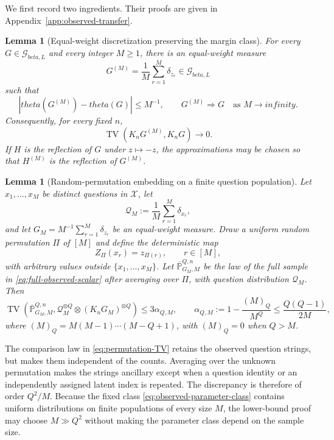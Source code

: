 \documentclass[11pt]{article}
\def\beta{beta}%
\def\theta{theta}%
\def\infty{infinity}%
\newtheorem{lemma}[theorem]{Lemma}
\newcommand{\TV}{\operatorname{TV}}
\newcommand{\calQ}{\mathcal Q}
\newcommand{\calG}{\mathcal G}
\begin{document}
We first record two ingredients.  Their proofs are given in Appendix~\ref{app:observed-transfer}.

\begin{lemma}[Equal-weight discretization preserving the margin class]
\label{lem:equal-weight-discretization}
For every $G\in\calG_{\beta,L}$ and every integer $M\ge1$, there is an equal-weight measure
\[
G^{(M)}
=
\frac1M\sum_{r=1}^M\delta_{z_r}
\in\calG_{\beta,L}
\]
such that
\[
|\theta(G^{(M)})-\theta(G)|\le M^{-1},
\qquad
G^{(M)}\Rightarrow G
\quad\text{as }M\to\infty.
\]
Consequently, for every fixed $n$,
\[
\TV(K_nG^{(M)},K_nG)\to0.
\]
If $H$ is the reflection of $G$ under $z\mapsto-z$, the approximations may be chosen so that $H^{(M)}$ is the reflection of $G^{(M)}$.
\end{lemma}

\begin{lemma}[Random-permutation embedding on a finite question population]
\label{lem:permutation-embedding}
Let $x_1,\dots,x_M$ be distinct questions in $\mathcal X$, let
\[
\calQ_M:=\frac1M\sum_{r=1}^M\delta_{x_r},
\]
and let $G_M=M^{-1}\sum_{r=1}^M\delta_{z_r}$ be an equal-weight measure.  Draw a uniform random permutation $\Pi$ of $[M]$ and define the deterministic map
\[
Z_\Pi(x_r)=z_{\Pi(r)},
\qquad r\in[M],
\]
with arbitrary values outside $\{x_1,\dots,x_M\}$.  Let $\overline{\mathbb P}^{Q,n}_{G_M,M}$ be the law of the full sample in \eqref{eq:full-observed-scalar} after averaging over $\Pi$, with question distribution $\calQ_M$.  Then
\begin{equation}
\label{eq:permutation-TV}
\TV\!\left(
\overline{\mathbb P}^{Q,n}_{G_M,M},
\calQ_M^{\otimes Q}\otimes(K_nG_M)^{\otimes Q}
\right)
\le
3\alpha_{Q,M},
\qquad
\alpha_{Q,M}
:=
1-\frac{(M)_Q}{M^Q}
\le
\frac{Q(Q-1)}{2M},
\end{equation}
where $(M)_Q=M(M-1)\cdots(M-Q+1)$, with $(M)_Q=0$ when $Q>M$.
\end{lemma}

The comparison law in \eqref{eq:permutation-TV} retains the observed question strings, but makes them independent of the counts.  Averaging over the unknown permutation makes the strings ancillary except when a question identity or an independently assigned latent index is repeated.  The discrepancy is therefore of order $Q^2/M$.  Because the fixed class \eqref{eq:observed-parameter-class} contains uniform distributions on finite populations of every size $M$, the lower-bound proof may choose $M\gg Q^2$ without making the parameter class depend on the sample size.
\end{document}
